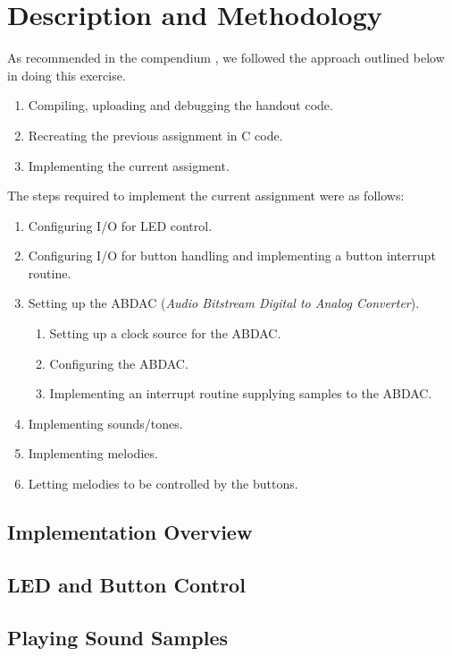 \section{Description and Methodology}

As recommended in the compendium \cite{comp}, we followed the approach
outlined below in doing this exercise.

\begin{enumerate}
    \item Compiling, uploading and debugging the handout code.
    \item Recreating the previous assignment in C code.
    \item Implementing the current assigment.
\end{enumerate}

The steps required to implement the current assignment were as follows:

\begin{enumerate}
    \item Configuring I/O for LED control.
    \item Configuring I/O for button handling and implementing a button
    interrupt routine.
    \item Setting up the ABDAC (\emph{Audio Bitstream Digital to Analog
    Converter}).
        \begin{enumerate}
            \item Setting up a clock source for the ABDAC.
            \item Configuring the ABDAC.
            \item Implementing an interrupt routine supplying samples to
            the ABDAC.
        \end{enumerate}
    \item Implementing sounds/tones.
    \item Implementing melodies.
    \item Letting melodies to be controlled by the buttons.
\end{enumerate}

\subsection{Implementation Overview}
\subsection{LED and Button Control}
\subsection{Playing Sound Samples}
